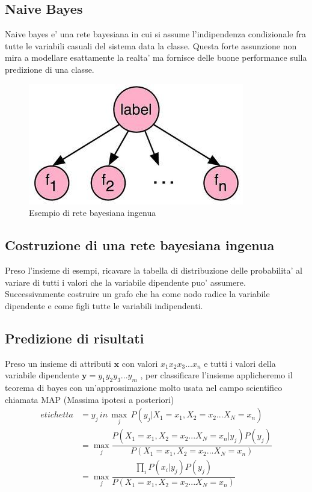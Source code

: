 \subsection*{Naive Bayes}
Naive bayes e' una rete bayesiana in cui si assume l'indipendenza condizionale fra tutte le variabili casuali del sistema data la classe. Questa forte assunzione non mira a modellare esattamente la realta' ma fornisce delle buone performance sulla predizione di una classe.

\begin{figure}[H]
	\centering
	\includegraphics[width=0.4\linewidth]{img/naive_bayes_example}
	\caption{Esempio di rete bayesiana ingenua}
	\label{fig:naivebayesexample}
\end{figure}

\subsection*{Costruzione di una rete bayesiana ingenua}
Preso l'insieme di esempi, ricavare la tabella di distribuzione delle probabilita' al variare di tutti i valori che la variabile dipendente puo' assumere. Successivamente costruire un grafo che ha come nodo radice la variabile dipendente e come figli tutte le variabili indipendenti.
\medskip
\subsection*{Predizione di risultati}
Preso un insieme di attributi $\textbf{x}$ con valori $x_1x_2x_3...x_n$ e tutti i valori della variabile dipendente $\textbf{y}=y_1y_2y_3...y_m$ , per classificare l'insieme applicheremo il teorema di bayes con un'approssimazione molto usata nel campo scientifico chiamata MAP (Massima ipotesi a posteriori)
\begin{align*}
		etichetta &=y_j \, in \, \max_j\,P(y_j|X_1=x_1, X_2=x_2...X_N=x_n) \\
		&= \max_j \dfrac{P(X_1=x_1,X_2=x_2...X_N=x_n|y_j)P(y_j)}{P(X_1=x_1, X_2=x_2...X_N=x_n)}\\
		&= \max_j \dfrac{\prod_iP(x_i|y_j)P(y_j)}{P(X_1=x_1, X_2=x_2...X_N=x_n)}
\end{align*}


